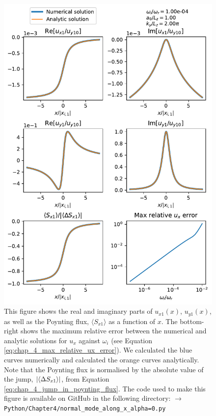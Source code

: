\begin{figure}
    \centering
    \vspace{-30pt}
    \includegraphics[width=\textwidth,height=0.85\textheight,keepaspectratio]{figures/chapter04/normal_mode_along_x_alpha=0.pdf}
    \vspace{-10pt}
    \caption{This figure shows the real and imaginary parts of $u_{x1}(x)$, $u_{y1}(x)$, as well as the Poynting flux, $\langle S_{x1}\rangle$ as a function of $x$. The bottom-right shows the maximum relative error between the numerical and analytic solutions for $u_x$ against $\omega_i$ (see Equation \ref{eq:chap_4_max_relative_ux_error}). We calculated the blue curves numerically and calculated the orange curves analytically. Note that the Poynting flux is normalised by the absolute value of the jump, $\abs{\langle\Delta S_{x1}\rangle}$, from Equation \eqref{eq:chap_4_jump_in_poynting_flux}. The code used to make this figure is available on GitHub in the following directory:\newline
    \texttt{$\rightarrow$ Python/Chapter4/normal\_mode\_along\_x\_alpha=0.py}}
    \vspace{-20pt}
    \label{fig:normal_mode_along_x_alpha=0}
\end{figure}

